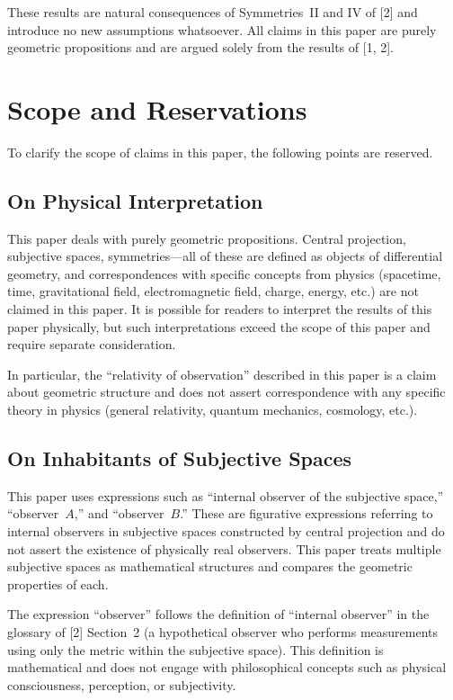 \documentclass[a4paper,11pt]{article}
\theoremstyle{definition}
\begin{document}
These results are natural consequences of Symmetries~II and IV of {[2]} and introduce no new assumptions whatsoever. All claims in this paper are purely geometric propositions and are argued solely from the results of {[1, 2]}.

\section{Scope and Reservations}

To clarify the scope of claims in this paper, the following points are reserved.

\subsection{On Physical Interpretation}

This paper deals with purely geometric propositions. Central projection, subjective spaces, symmetries---all of these are defined as objects of differential geometry, and correspondences with specific concepts from physics (spacetime, time, gravitational field, electromagnetic field, charge, energy, etc.) are not claimed in this paper. It is possible for readers to interpret the results of this paper physically, but such interpretations exceed the scope of this paper and require separate consideration.

In particular, the ``relativity of observation'' described in this paper is a claim about geometric structure and does not assert correspondence with any specific theory in physics (general relativity, quantum mechanics, cosmology, etc.).

\subsection{On Inhabitants of Subjective Spaces}

This paper uses expressions such as ``internal observer of the subjective space,'' ``observer~\(A\),'' and ``observer~\(B\).'' These are figurative expressions referring to internal observers in subjective spaces constructed by central projection and do not assert the existence of physically real observers. This paper treats multiple subjective spaces as mathematical structures and compares the geometric properties of each.

The expression ``observer'' follows the definition of ``internal observer'' in the glossary of {[2]} Section~2 (a hypothetical observer who performs measurements using only the metric within the subjective space). This definition is mathematical and does not engage with philosophical concepts such as physical consciousness, perception, or subjectivity.
\end{document}
